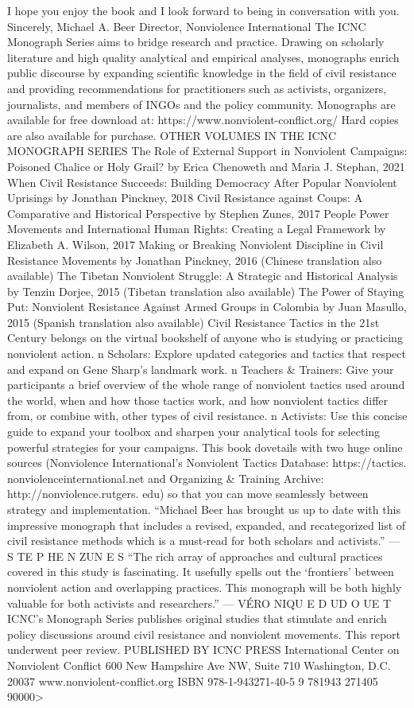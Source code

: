 \documentclass[twoside,a4paper,12pt,fleqn,openany]{extbook}
\begin{document}
I hope you enjoy the book and I look forward to being in conversation with you.
Sincerely,
Michael A. Beer
Director, Nonviolence International
The ICNC Monograph Series aims to bridge research and practice. Drawing on
scholarly literature and high quality analytical and empirical analyses, monographs
enrich public discourse by expanding scientific knowledge in the field of civil
resistance and providing recommendations for practitioners such as activists,
organizers, journalists, and members of INGOs and the policy community.
Monographs are available for free download at:
https://www.nonviolent-conflict.org/
Hard copies are also available for purchase.
OTHER VOLUMES IN THE ICNC MONOGRAPH SERIES
The Role of External Support in Nonviolent Campaigns:
Poisoned Chalice or Holy Grail?
by Erica Chenoweth and Maria J. Stephan, 2021
When Civil Resistance Succeeds: Building Democracy
After Popular Nonviolent Uprisings
by Jonathan Pinckney, 2018
Civil Resistance against Coups: A Comparative
and Historical Perspective
by Stephen Zunes, 2017
People Power Movements and International Human Rights:
Creating a Legal Framework
by Elizabeth A. Wilson, 2017
Making or Breaking Nonviolent Discipline in Civil Resistance Movements
by Jonathan Pinckney, 2016
(Chinese translation also available)
The Tibetan Nonviolent Struggle: A Strategic and Historical Analysis
by Tenzin Dorjee, 2015
(Tibetan translation also available)
The Power of Staying Put: Nonviolent Resistance
Against Armed Groups in Colombia
by Juan Masullo, 2015
(Spanish translation also available)
Civil Resistance Tactics in the 21st Century belongs on the virtual bookshelf
of anyone who is studying or practicing nonviolent action.
n Scholars: Explore updated categories and
tactics that respect and expand on Gene
Sharp's landmark work.
n Teachers & Trainers: Give your participants
a brief overview of the whole range of
nonviolent tactics used around the world,
when and how those tactics work, and how
nonviolent tactics differ from, or combine
with, other types of civil resistance.
n Activists: Use this concise guide to expand
your toolbox and sharpen your analytical
tools for selecting powerful strategies for
your campaigns.
This book dovetails with two huge online
sources (Nonviolence International’s
Nonviolent Tactics Database: https://tactics.
nonviolenceinternational.net and Organizing &
Training Archive: http://nonviolence.rutgers.
edu) so that you can move seamlessly between
strategy and implementation.
“Michael Beer has brought us up to date with this impressive
monograph that includes a revised, expanded, and recategorized
list of civil resistance methods which is a must-read for both
scholars and activists.” — S TE P HE N ZUN E S
“The rich array of approaches and cultural practices covered in
this study is fascinating. It usefully spells out the ‘frontiers’ between
nonviolent action and overlapping practices. This monograph
will be both highly valuable for both activists and researchers.”
— VÉRO NIQU E D UD O UE T
ICNC’s Monograph Series publishes original studies
that stimulate and enrich policy discussions around
civil resistance and nonviolent movements.
This report underwent peer review.
PUBLISHED BY ICNC PRESS
International Center on Nonviolent Conflict
600 New Hampshire Ave NW, Suite 710
Washington, D.C. 20037
www.nonviolent-conflict.org
ISBN 978-1-943271-40-5
9 781943 271405
90000>
\end{document}

